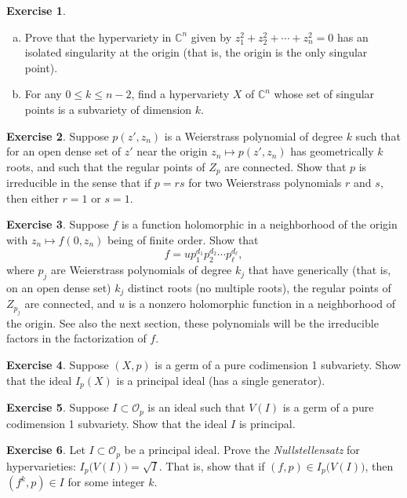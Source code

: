 \documentclass[12pt,openany]{book}
\newcommand{\C}{{\mathbb{C}}}
\newcommand{\sO}{{\mathscr{O}}}
\newcommand{\myindex}[1]{#1\index{#1}}
\theoremstyle{plain}
\theoremstyle{remark}
\theoremstyle{definition}
\newenvironment{exbox}{%
    \def\FrameCommand{\vrule width 1pt \relax\hspace {10pt}}%
    \MakeFramed {\advance \hsize -\width \FrameRestore }%
}{%
    \endMakeFramed
}
\newenvironment{exparts}{%
    \leavevmode\begin{enumerate}[a),noitemsep,topsep=0pt,parsep=0pt,partopsep=0pt]
}{%
    \end{enumerate}
}
\theoremstyle{exercise}
\newtheorem{exercise}{Exercise}[section]
\theoremstyle{example}
\begin{document}
\pagebreak[2]
\begin{exbox}
\begin{exercise}
\begin{exparts}
\item
Prove that the hypervariety in $\C^n$ given by $z_1^2 + z_2^2 + \cdots + z_n^2 = 0$
has an isolated singularity at the origin (that is, the origin is the only
singular point).
\item
For any $0 \leq k \leq n-2$, find a hypervariety $X$ of $\C^n$ whose set
of singular points is a subvariety of dimension $k$.
\end{exparts}
\end{exercise}

\begin{exercise}
Suppose $p(z',z_n)$ is a Weierstrass polynomial of degree $k$ such that
for an open dense set of $z'$ near the origin 
$z_n \mapsto p(z',z_n)$ has geometrically $k$ roots, and such that the
regular points of $Z_p$ are connected.  Show that $p$ is
irreducible in the sense that if $p = rs$ for two Weierstrass polynomials
$r$ and $s$, then either $r=1$ or $s=1$.
\end{exercise}

\begin{samepage}
\begin{exercise}
Suppose $f$ is a function holomorphic in a neighborhood of the origin with
$z_n \mapsto f(0,z_n)$ being of finite order.  Show that
\begin{equation*}
f = u p_1^{d_1} p_2^{d_2} \cdots p_\ell^{d_\ell} ,
\end{equation*}
where $p_j$ are Weierstrass polynomials of degree $k_j$ that have
generically (that is, on an open dense set) $k_j$ distinct roots
(no multiple roots), the regular points of $Z_{p_j}$ are
connected, and $u$ is a nonzero holomorphic function
in a neighborhood of the origin.  See also the next section, these
polynomials will be the irreducible factors in the factorization of $f$.
\end{exercise}
\end{samepage}

\begin{exercise}
Suppose $(X,p)$ is a germ of a pure codimension 1 subvariety.  Show that
the ideal $I_p(X)$ is a principal ideal (has a single generator).
\end{exercise}

\begin{exercise}
Suppose $I \subset \sO_p$ is an ideal such that $V(I)$ is a germ of a pure codimension 1 subvariety.  Show that
the ideal $I$ is principal.
\end{exercise}

\begin{exercise}
Let $I \subset \sO_p$ be a principal ideal.  Prove the
\emph{\myindex{Nullstellensatz}} for hypervarieties: 
$I_p\bigl(V(I)\bigr) = \sqrt{I}$.  That is, show that if 
$(f,p) \in I_p\bigl(V(I)\bigr)$, then $(f^k,p) \in I$ for some integer $k$.
\end{exercise}
\end{exbox}
\end{document}
